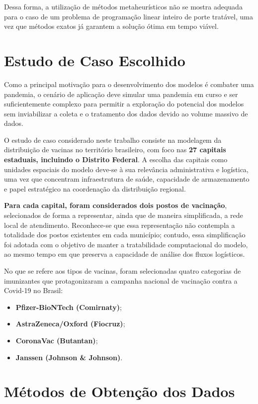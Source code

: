 Dessa forma, a utilização de métodos metaheurísticos  não se mostra adequada para o caso de um problema de programação linear inteiro de porte tratável, uma vez que métodos exatos já garantem a solução ótima em tempo viável.


\section{Estudo de Caso Escolhido}

Como a principal motivação para o desenvolvimento dos modelos é combater uma pandemia, o cenário de aplicação deve simular uma pandemia em curso e ser suficientemente complexo para permitir a exploração do potencial dos modelos sem inviabilizar a coleta e o tratamento dos dados devido ao volume massivo de dados.

O estudo de caso considerado neste trabalho consiste na modelagem da distribuição de vacinas no território brasileiro, com foco nas \textbf{27 capitais estaduais, incluindo o Distrito Federal}. A escolha das capitais como unidades espaciais do modelo deve-se à sua relevância administrativa e logística, uma vez que concentram infraestrutura de saúde, capacidade de armazenamento e papel estratégico na coordenação da distribuição regional.

\textbf{Para cada capital, foram considerados dois postos de vacinação}, selecionados de forma a representar, ainda que de maneira simplificada, a rede local de atendimento. Reconhece-se que essa representação não contempla a totalidade dos postos existentes em cada município; contudo, essa simplificação foi adotada com o objetivo de manter a tratabilidade computacional do modelo, ao mesmo tempo em que preserva a capacidade de análise dos fluxos logísticos.

No que se refere aos tipos de vacinas, foram selecionadas quatro categorias de imunizantes que protagonizaram a campanha nacional de vacinação contra a Covid-19 no Brasil:

\begin{itemize}
    \item \textbf{Pfizer-BioNTech (Comirnaty)};
    \item \textbf{AstraZeneca/Oxford (Fiocruz)};
    \item \textbf{CoronaVac (Butantan)};
    \item \textbf{Janssen (Johnson \& Johnson)}.
\end{itemize}


\section{Métodos de Obtenção dos Dados}

